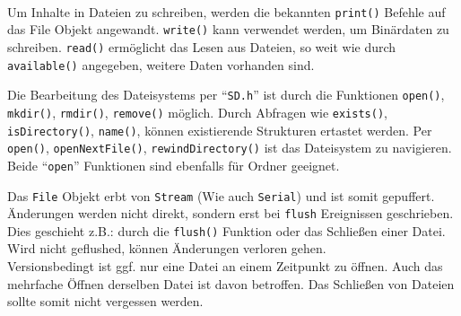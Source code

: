 \documentclass[ngerman]{handout}
\begin{document}
\begin{multicols*}{2}
    \\

    Um Inhalte in Dateien zu schreiben, werden die bekannten \texttt{print()} Befehle auf das File Objekt angewandt.
    \texttt{write()} kann verwendet werden, um Binärdaten zu schreiben.
    \texttt{read()} ermöglicht das Lesen aus Dateien, so weit wie durch \texttt{available()} angegeben, weitere Daten vorhanden sind.

    Die Bearbeitung des Dateisystems per \enquote{\texttt{SD.h}} ist durch die Funktionen \texttt{open()}, \texttt{mkdir()}, \texttt{rmdir()}, \texttt{remove()} möglich.
    Durch Abfragen wie \texttt{exists()}, \texttt{isDirectory()}, \texttt{name()}, können existierende Strukturen ertastet werden.
    Per \texttt{open()}, \texttt{openNextFile()}, \texttt{rewindDirectory()} ist das Dateisystem zu navigieren.
    Beide \enquote{\texttt{open}} Funktionen sind ebenfalls für Ordner geeignet.

    Das \texttt{File} Objekt erbt von \texttt{Stream} (Wie auch \texttt{Serial}) und ist somit gepuffert.
    Änderungen werden nicht direkt, sondern erst bei \texttt{flush} Ereignissen geschrieben.
    Dies geschieht z.B.: durch die \texttt{flush()} Funktion oder das Schließen einer Datei.
    Wird nicht geflushed, können Änderungen verloren gehen.\\

    Versionsbedingt ist ggf. nur eine Datei an einem Zeitpunkt zu öffnen.
    Auch das mehrfache Öffnen derselben Datei ist davon betroffen.
    Das Schließen von Dateien sollte somit nicht vergessen werden.\\


\end{multicols*}
\end{document}
